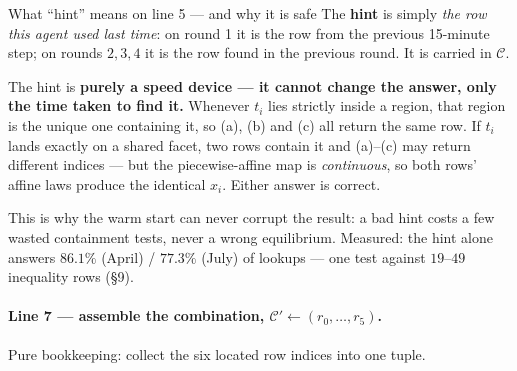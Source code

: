 \documentclass[11pt, letterpaper]{article}
\begin{document}
\begin{keybox}{What ``hint'' means on line 5 --- and why it is safe}
The \textbf{hint} is simply \emph{the row this agent used last time}: on round 1 it is the row from
the previous 15-minute step; on rounds $2,3,4$ it is the row found in the previous round. It is
carried in $\mathcal C$.

The hint is \textbf{purely a speed device --- it cannot change the answer, only the time taken to find
it.} Whenever $t_i$ lies strictly inside a region, that region is the unique one containing it, so
(a), (b) and (c) all return the same row. If $t_i$ lands exactly on a shared facet, two rows contain
it and (a)--(c) may return different indices --- but the piecewise-affine map is \emph{continuous}, so
both rows' affine laws produce the identical $x_i$. Either answer is correct.

This is why the warm start can never corrupt the result: a bad hint costs a few wasted containment
tests, never a wrong equilibrium. Measured: the hint alone answers $86.1\%$ (April) / $77.3\%$ (July)
of lookups --- one test against $19$--$49$ inequality rows (\S9).
\end{keybox}

\paragraph{Line 7 --- assemble the combination, $\mathcal C'\gets(r_0,\dots,r_5)$.}
Pure bookkeeping: collect the six located row indices into one tuple.
\end{document}
